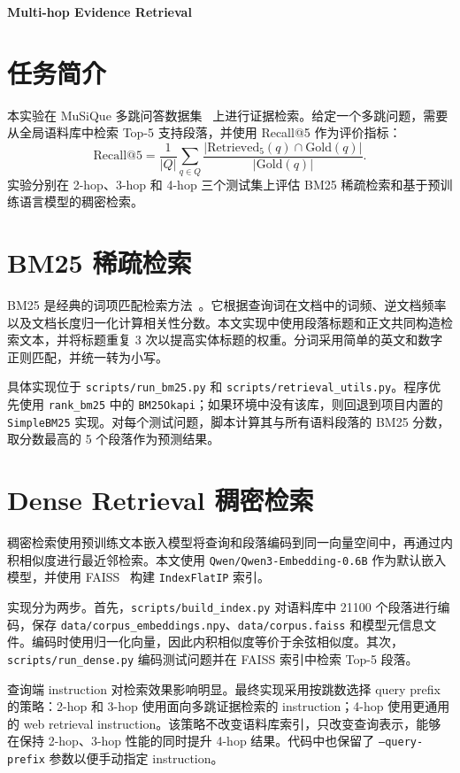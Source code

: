 \documentclass[12pt,letterpaper]{article}
\begin{document}
\begin{center}
    {\LARGE\bf Multi-hop Evidence Retrieval}
\end{center}

\section{任务简介}

本实验在 MuSiQue 多跳问答数据集~\cite{trivedi2022musique} 上进行证据检索。给定一个多跳问题，需要从全局语料库中检索 Top-5 支持段落，并使用 Recall@5 作为评价指标：
\[
\mathrm{Recall@5}=\frac{1}{|Q|}\sum_{q\in Q}\frac{|\mathrm{Retrieved}_5(q)\cap \mathrm{Gold}(q)|}{|\mathrm{Gold}(q)|}.
\]
实验分别在 2-hop、3-hop 和 4-hop 三个测试集上评估 BM25 稀疏检索和基于预训练语言模型的稠密检索。

\section{BM25 稀疏检索}

BM25 是经典的词项匹配检索方法~\cite{robertson1995okapi}。它根据查询词在文档中的词频、逆文档频率以及文档长度归一化计算相关性分数。本文实现中使用段落标题和正文共同构造检索文本，并将标题重复 3 次以提高实体标题的权重。分词采用简单的英文和数字正则匹配，并统一转为小写。

具体实现位于 \texttt{scripts/run\_bm25.py} 和 \texttt{scripts/retrieval\_utils.py}。程序优先使用 \texttt{rank\_bm25} 中的 \texttt{BM25Okapi}；如果环境中没有该库，则回退到项目内置的 \texttt{SimpleBM25} 实现。对每个测试问题，脚本计算其与所有语料段落的 BM25 分数，取分数最高的 5 个段落作为预测结果。

\section{Dense Retrieval 稠密检索}

稠密检索使用预训练文本嵌入模型将查询和段落编码到同一向量空间中，再通过内积相似度进行最近邻检索。本文使用 \texttt{Qwen/Qwen3-Embedding-0.6B} 作为默认嵌入模型，并使用 FAISS~\cite{johnson2019billion} 构建 \texttt{IndexFlatIP} 索引。

实现分为两步。首先，\texttt{scripts/build\_index.py} 对语料库中 21100 个段落进行编码，保存 \texttt{data/corpus\_embeddings.npy}、\texttt{data/corpus.faiss} 和模型元信息文件。编码时使用归一化向量，因此内积相似度等价于余弦相似度。其次，\texttt{scripts/run\_dense.py} 编码测试问题并在 FAISS 索引中检索 Top-5 段落。

查询端 instruction 对检索效果影响明显。最终实现采用按跳数选择 query prefix 的策略：2-hop 和 3-hop 使用面向多跳证据检索的 instruction；4-hop 使用更通用的 web retrieval instruction。该策略不改变语料库索引，只改变查询表示，能够在保持 2-hop、3-hop 性能的同时提升 4-hop 结果。代码中也保留了 \texttt{--query-prefix} 参数以便手动指定 instruction。
\end{document}
